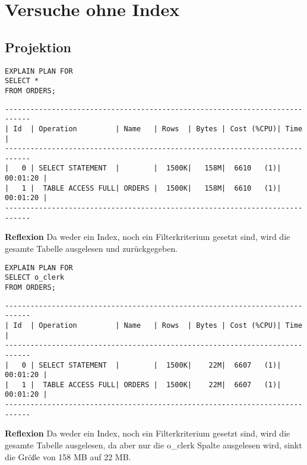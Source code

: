 \documentclass[10pt]{article}
\begin{document}
\section{Versuche ohne Index}
\subsection{Projektion}
\begin{lstlisting}[style=sql]
EXPLAIN PLAN FOR
SELECT *
FROM ORDERS;
\end{lstlisting}
\begin{lstlisting}[style=queryexecutionplan]
----------------------------------------------------------------------------
| Id  | Operation         | Name   | Rows  | Bytes | Cost (%CPU)| Time     |
----------------------------------------------------------------------------
|   0 | SELECT STATEMENT  |        |  1500K|   158M|  6610   (1)| 00:01:20 |
|   1 |  TABLE ACCESS FULL| ORDERS |  1500K|   158M|  6610   (1)| 00:01:20 |
----------------------------------------------------------------------------
\end{lstlisting}
\textbf{Reflexion} \newline
Da weder ein Index, noch ein Filterkriterium gesetzt sind, wird die gesamte Tabelle ausgelesen und zurückgegeben.

\begin{lstlisting}[style=sql]
EXPLAIN PLAN FOR
SELECT o_clerk
FROM ORDERS;
\end{lstlisting}
\begin{lstlisting}[style=queryexecutionplan]
----------------------------------------------------------------------------
| Id  | Operation         | Name   | Rows  | Bytes | Cost (%CPU)| Time     |
----------------------------------------------------------------------------
|   0 | SELECT STATEMENT  |        |  1500K|    22M|  6607   (1)| 00:01:20 |
|   1 |  TABLE ACCESS FULL| ORDERS |  1500K|    22M|  6607   (1)| 00:01:20 |
----------------------------------------------------------------------------
\end{lstlisting}
\textbf{Reflexion} \newline
Da weder ein Index, noch ein Filterkriterium gesetzt sind, wird die gesamte Tabelle ausgelesen, da aber nur die o\_clerk Spalte ausgelesen wird, sinkt die Größe von 158 MB auf 22 MB.
\end{document}
